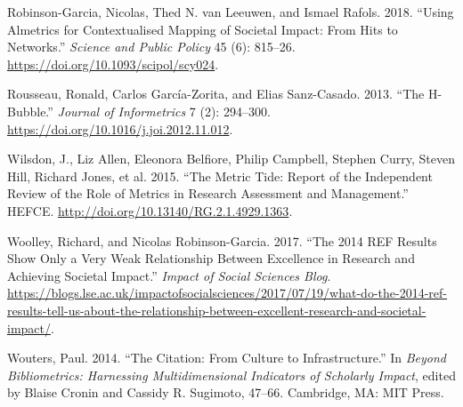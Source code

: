 \documentclass[]{elsarticle} %
\begin{document}
\leavevmode\hypertarget{ref-robinson-garciaUsingAlmetricsContextualised2018}{}%
Robinson-Garcia, Nicolas, Thed N. van Leeuwen, and Ismael Rafols. 2018.
``Using Almetrics for Contextualised Mapping of Societal Impact: From
Hits to Networks.'' \emph{Science and Public Policy} 45 (6): 815--26.
\url{https://doi.org/10.1093/scipol/scy024}.

\leavevmode\hypertarget{ref-rousseauHbubble2013}{}%
Rousseau, Ronald, Carlos García-Zorita, and Elias Sanz-Casado. 2013.
``The H-Bubble.'' \emph{Journal of Informetrics} 7 (2): 294--300.
\url{https://doi.org/10.1016/j.joi.2012.11.012}.

\leavevmode\hypertarget{ref-wilsdonMetricTideReport2015}{}%
Wilsdon, J., Liz Allen, Eleonora Belfiore, Philip Campbell, Stephen
Curry, Steven Hill, Richard Jones, et al. 2015. ``The Metric Tide:
Report of the Independent Review of the Role of Metrics in Research
Assessment and Management.'' HEFCE.
\url{http://doi.org/10.13140/RG.2.1.4929.1363}.

\leavevmode\hypertarget{ref-woolley2014REFResults2017}{}%
Woolley, Richard, and Nicolas Robinson-Garcia. 2017. ``The 2014 REF
Results Show Only a Very Weak Relationship Between Excellence in
Research and Achieving Societal Impact.'' \emph{Impact of Social
Sciences Blog}.
\url{https://blogs.lse.ac.uk/impactofsocialsciences/2017/07/19/what-do-the-2014-ref-results-tell-us-about-the-relationship-between-excellent-research-and-societal-impact/}.

\leavevmode\hypertarget{ref-woutersCitationCultureInfrastructure2014}{}%
Wouters, Paul. 2014. ``The Citation: From Culture to Infrastructure.''
In \emph{Beyond Bibliometrics: Harnessing Multidimensional Indicators of
Scholarly Impact}, edited by Blaise Cronin and Cassidy R. Sugimoto,
47--66. Cambridge, MA: MIT Press.
\end{document}
